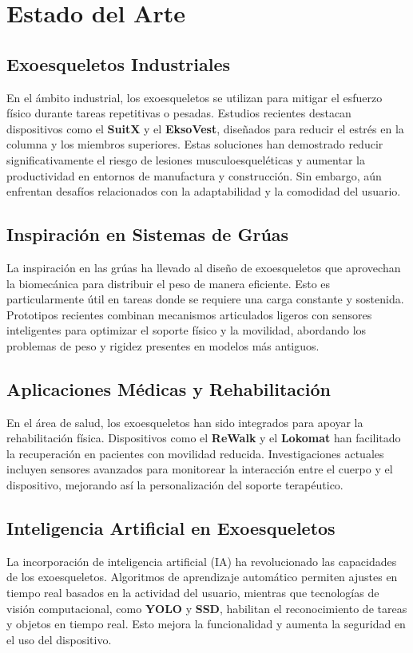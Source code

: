 \section*{Estado del Arte}

\subsection*{Exoesqueletos Industriales}
En el ámbito industrial, los exoesqueletos se utilizan para mitigar el esfuerzo físico durante tareas repetitivas o pesadas. Estudios recientes destacan dispositivos como el \textbf{SuitX} y el \textbf{EksoVest}, diseñados para reducir el estrés en la columna y los miembros superiores. Estas soluciones han demostrado reducir significativamente el riesgo de lesiones musculoesqueléticas y aumentar la productividad en entornos de manufactura y construcción. Sin embargo, aún enfrentan desafíos relacionados con la adaptabilidad y la comodidad del usuario.

\subsection*{Inspiración en Sistemas de Grúas}
La inspiración en las grúas ha llevado al diseño de exoesqueletos que aprovechan la biomecánica para distribuir el peso de manera eficiente. Esto es particularmente útil en tareas donde se requiere una carga constante y sostenida. Prototipos recientes combinan mecanismos articulados ligeros con sensores inteligentes para optimizar el soporte físico y la movilidad, abordando los problemas de peso y rigidez presentes en modelos más antiguos.

\subsection*{Aplicaciones Médicas y Rehabilitación}
En el área de salud, los exoesqueletos han sido integrados para apoyar la rehabilitación física. Dispositivos como el \textbf{ReWalk} y el \textbf{Lokomat} han facilitado la recuperación en pacientes con movilidad reducida. Investigaciones actuales incluyen sensores avanzados para monitorear la interacción entre el cuerpo y el dispositivo, mejorando así la personalización del soporte terapéutico.

\subsection*{Inteligencia Artificial en Exoesqueletos}
La incorporación de inteligencia artificial (IA) ha revolucionado las capacidades de los exoesqueletos. Algoritmos de aprendizaje automático permiten ajustes en tiempo real basados en la actividad del usuario, mientras que tecnologías de visión computacional, como \textbf{YOLO} y \textbf{SSD}, habilitan el reconocimiento de tareas y objetos en tiempo real. Esto mejora la funcionalidad y aumenta la seguridad en el uso del dispositivo.

